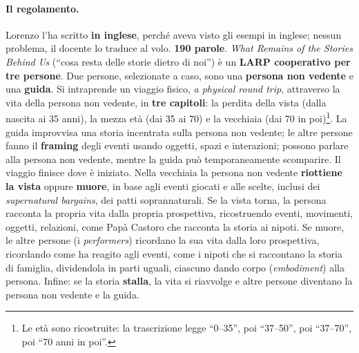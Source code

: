 \paragraph{Il regolamento.} Lorenzo l'ha scritto \textbf{in inglese}, perché aveva
visto gli esempi in inglese; nessun problema, il docente lo traduce al volo.
\textbf{190 parole}. \emph{What Remains of the Stories Behind Us} (``cosa resta delle
storie dietro di noi'') è un \textbf{LARP cooperativo per tre persone}. Due persone,
selezionate a caso, sono una \textbf{persona non vedente} e una \textbf{guida}. Si
intraprende un viaggio fisico, \emph{a physical round trip}, attraverso la vita della
persona non vedente, in \textbf{tre capitoli}: la perdita della vista (dalla nascita ai
35 anni), la mezza età (dai 35 ai 70) e la vecchiaia (dai 70 in poi)\footnote{Le età
sono ricostruite: la trascrizione legge ``0--35'', poi ``37--50'', poi ``37--70'',
poi ``70 anni in poi''.}. La guida improvvisa una storia incentrata sulla persona non
vedente; le altre persone fanno il \textbf{framing} degli eventi usando oggetti, spazi e
interazioni; possono parlare alla persona non vedente, mentre la guida può
temporaneamente scomparire. Il viaggio finisce dove è iniziato. Nella vecchiaia la
persona non vedente \textbf{riottiene la vista} oppure \textbf{muore}, in base agli
eventi giocati e alle scelte, inclusi dei \emph{supernatural bargains}, dei patti
soprannaturali. Se la vista torna, la persona racconta la propria vita dalla propria
prospettiva, ricostruendo eventi, movimenti, oggetti, relazioni, come Papà Castoro che
racconta la storia ai nipoti. Se muore, le altre persone (i \emph{performers})
ricordano la sua vita dalla loro prospettiva, ricordando come ha reagito agli eventi,
come i nipoti che si raccontano la storia di famiglia, dividendola in parti uguali,
ciascuno dando corpo (\emph{embodiment}) alla persona. Infine: se la storia
\textbf{stalla}, la vita si riavvolge e altre persone diventano la persona non vedente
e la guida.

